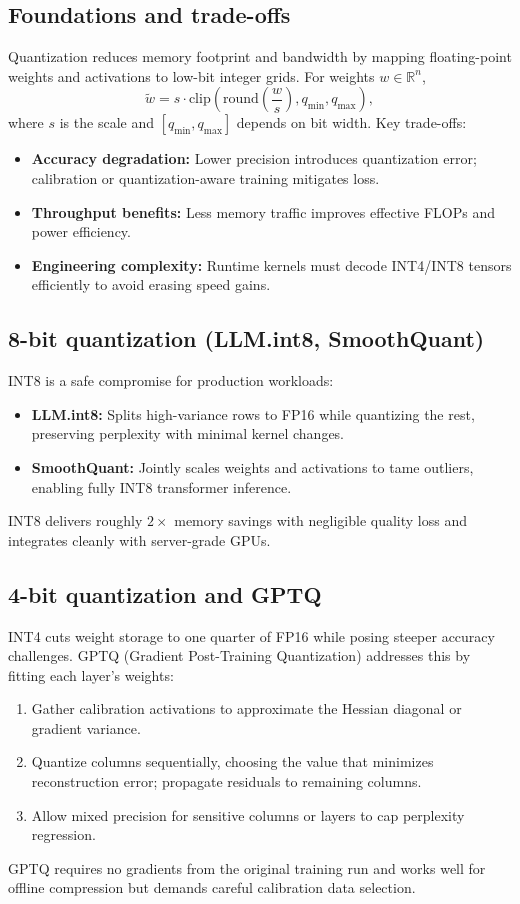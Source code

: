 \documentclass{article}
\begin{document}
\subsection{Foundations and trade-offs}
Quantization reduces memory footprint and bandwidth by mapping floating-point weights and activations to low-bit integer grids. For weights $w \in \mathbb{R}^n$,
\begin{equation}
  \tilde{w} = s \cdot \mathrm{clip}\!\left(\mathrm{round}\!\left(\frac{w}{s}\right), q_{\min}, q_{\max}\right),
\end{equation}
where $s$ is the scale and $[q_{\min}, q_{\max}]$ depends on bit width. Key trade-offs:
\begin{itemize}
  \item \textbf{Accuracy degradation:} Lower precision introduces quantization error; calibration or quantization-aware training mitigates loss.
  \item \textbf{Throughput benefits:} Less memory traffic improves effective FLOPs and power efficiency.
  \item \textbf{Engineering complexity:} Runtime kernels must decode INT4/INT8 tensors efficiently to avoid erasing speed gains.
\end{itemize}

\subsection{8-bit quantization (LLM.int8, SmoothQuant)}
INT8 is a safe compromise for production workloads:
\begin{itemize}
  \item \textbf{LLM.int8:} Splits high-variance rows to FP16 while quantizing the rest, preserving perplexity with minimal kernel changes.
  \item \textbf{SmoothQuant:} Jointly scales weights and activations to tame outliers, enabling fully INT8 transformer inference.
\end{itemize}
INT8 delivers roughly $2\times$ memory savings with negligible quality loss and integrates cleanly with server-grade GPUs.

\subsection{4-bit quantization and GPTQ}
INT4 cuts weight storage to one quarter of FP16 while posing steeper accuracy challenges. GPTQ (Gradient Post-Training Quantization) addresses this by fitting each layer's weights:
\begin{enumerate}
  \item Gather calibration activations to approximate the Hessian diagonal or gradient variance.
  \item Quantize columns sequentially, choosing the value that minimizes reconstruction error; propagate residuals to remaining columns.
  \item Allow mixed precision for sensitive columns or layers to cap perplexity regression.
\end{enumerate}
GPTQ requires no gradients from the original training run and works well for offline compression but demands careful calibration data selection.
\end{document}
